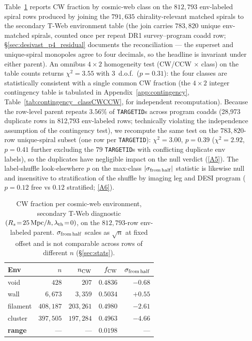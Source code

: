 \documentclass[aps,prd,twocolumn,superscriptaddress,showpacs,preprintnumbers,nofootinbib,longbibliography,floatfix]{revtex4-2}
\newcommand{\repoBase}{https://github.com/Hubify-Projects/bigbounce/blob/main}
\begin{document}
Table~\ref{tab:cw_vs_env} reports CW fraction by cosmic-web class on
the $812{,}793$ env-labeled spiral rows produced by joining the
$791{,}635$ chirality-relevant matched spirals to the secondary T-Web
environment table (the join carries $783{,}820$ unique env-matched
spirals, counted once per repeat DR1 survey--program coadd row;
\S\ref{sec:desivast_p4_residual} documents the reconciliation — the
superset and unique-spiral monopoles agree to four decimals, so the
headline is invariant under either parent). An omnibus $4\times2$
homogeneity test (CW/CCW $\times$ class) on the table counts returns
$\chi^2 = 3.55$ with 3~d.o.f.\ ($p = 0.31$): the four classes are
statistically consistent with a single common CW fraction (the
$4{\times}2$ integer contingency table is tabulated in
Appendix~\ref{app:contingency}, Table~\ref{tab:contingency_classCWCCW},
for independent recomputation). Because
the row-level parent repeats $3.56\%$ of \texttt{TARGETID}s across program coadds
(28{,}973 duplicate rows in 812{,}793 env-labeled rows; technically violating the independence assumption of
the contingency test), we recompute the same test on the
$783{,}820$-row unique-spiral subset (one row per \texttt{TARGETID}):
$\chi^2 = 3.00$, $p = 0.39$ ($\chi^2 = 2.92$, $p = 0.41$ further
excluding the $79$ \texttt{TARGETID}s with conflicting duplicate env
labels), so the duplicates have negligible impact on the null verdict
(\href{\repoBase/pipelines/p5\_desi\_chirality/outputs/21\_r23conf\_meta\_closures.json}{[A5]}). The
label-shuffle look-elsewhere $p$ on the max-class
$|\sigma_{\rm from\,half}|$ statistic is likewise null and insensitive
to stratification of the shuffle by imaging leg and DESI program
($p = 0.12$ free vs $0.12$ stratified;
\href{\repoBase/pipelines/p5\_desi\_chirality/outputs/18\_v0151\_stratified\_and\_density.json}{[A6]}).

\begin{table}[t]
\caption{CW fraction per cosmic-web environment, secondary T-Web
diagnostic $(R_s\!=\!25\,{\rm Mpc}/h, \lambda_{\rm th}\!=\!0)$, on the
$812{,}793$-row env-labeled parent. $\sigma_{\rm from\,half}$ scales
as $\sqrt{n}$ at fixed offset and is not comparable across rows of
different $n$ (\S\ref{sec:stats}).}
\label{tab:cw_vs_env}
\begin{ruledtabular}
\begin{tabular}{lrrrr}
Env & $n$ & $n_{\rm CW}$ & $f_{\rm CW}$ & $\sigma_{\rm from\,half}$ \\
\hline
void & $428$ & $207$ & $0.4836$ & $-0.68$ \\
wall & $6{,}673$ & $3{,}359$ & $0.5034$ & $+0.55$ \\
filament & $408{,}187$ & $203{,}261$ & $0.4980$ & $-2.61$ \\
cluster & $397{,}505$ & $197{,}284$ & $0.4963$ & $-4.66$ \\
\hline
\textbf{range} & --- & --- & $\mathbf{0.0198}$ & --- \\
\end{tabular}
\end{ruledtabular}
\end{table}
\end{document}
